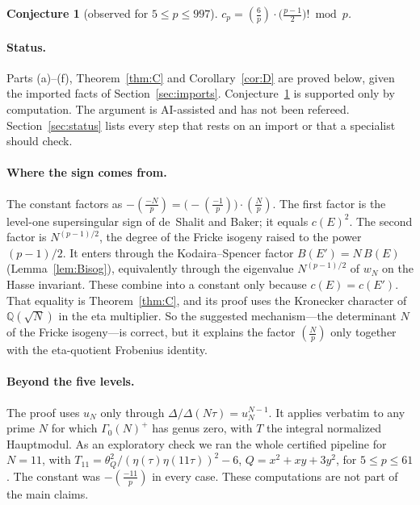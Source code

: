\documentclass[11pt,a4paper]{article}
\numberwithin{equation}{section}
\newtheorem{conjecture}[theorem]{Conjecture}
\theoremstyle{definition}
\theoremstyle{remark}
\newcommand{\Q}{\mathbb Q}
\newcommand{\leg}[2]{\left(\frac{#1}{#2}\right)}
\newcommand{\Lp}[1]{\left(\frac{#1}{p}\right)}
\begin{document}
\begin{conjecture}[observed for $5\le p\le 997$]\label{conj:E}
$c_p=\leg{6}{p}\cdot\bigl(\tfrac{p-1}{2}\bigr)!\bmod p$.
\end{conjecture}

\paragraph{Status.} Parts (a)--(f), Theorem~\ref{thm:C} and Corollary~\ref{cor:D} are proved below,
given the imported facts of Section~\ref{sec:imports}. Conjecture~\ref{conj:E} is supported only by
computation. The argument is AI-assisted and has not been refereed. Section~\ref{sec:status}
lists every step that rests on an import or that a specialist should check.

\paragraph{Where the sign comes from.} The constant factors as
$-\Lp{-N}=\bigl(-\Lp{-1}\bigr)\cdot\Lp{N}$. The first factor is the level-one supersingular sign of
de~Shalit and Baker; it equals $c(E)^2$. The second factor is $N^{(p-1)/2}$, the degree of the Fricke isogeny raised to the power $(p-1)/2$.
It enters through the Kodaira--Spencer factor $B(E')=N\,B(E)$ (Lemma~\ref{lem:Bisog}),
equivalently through the eigenvalue $N^{(p-1)/2}$ of $w_N$ on the Hasse invariant. These combine
into a constant only because $c(E)=c(E')$. That equality is Theorem~\ref{thm:C}, and its
proof uses the Kronecker character of $\Q(\sqrt N)$ in the eta multiplier. So the suggested
mechanism---the determinant $N$ of the Fricke isogeny---is correct, but it explains the factor
$\Lp{N}$ only together with the eta-quotient Frobenius identity.

\paragraph{Beyond the five levels.} The proof uses $u_N$ only through
$\Delta/\Delta(N\tau)=u_N^{N-1}$. It applies verbatim to any prime $N$ for which $\Gamma_0(N)^+$
has genus zero, with $T$ the integral normalized Hauptmodul. As an exploratory check we ran the
whole certified pipeline for $N=11$, with $T_{11}=\theta_Q^2/(\eta(\tau)\eta(11\tau))^2-6$,
$Q=x^2+xy+3y^2$, for $5\le p\le61$. The constant was $-\leg{-11}{p}$ in every case. These computations are
not part of the main claims.

\end{document}
